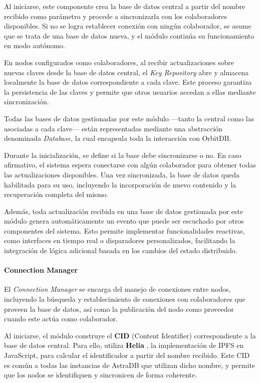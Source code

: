 Al iniciarse, este componente crea la base de datos central a partir del nombre recibido como parámetro y procede a sincronizarla con los colaboradores disponibles. Si no se logra establecer conexión con ningún colaborador, se asume que se trata de una base de datos nueva, y el módulo continúa su funcionamiento en modo autónomo.

En nodos configurados como colaboradores, al recibir actualizaciones sobre nuevas claves desde la base de datos central, el \textit{Key Repository} abre y almacena localmente la base de datos correspondiente a cada clave. Este proceso garantiza la persistencia de las claves y permite que otros usuarios accedan a ellas mediante sincronización.

Todas las bases de datos gestionadas por este módulo —tanto la central como las asociadas a cada clave— están representadas mediante una abstracción denominada \textit{Database}, la cual encapsula toda la interacción con OrbitDB.

Durante la inicialización, se define si la base debe sincronizarse o no. En caso afirmativo, el sistema espera conectarse con algún colaborador para obtener todas las actualizaciones disponibles. Una vez sincronizada, la base de datos queda habilitada para su uso, incluyendo la incorporación de nuevo contenido y la recuperación completa del mismo.

Además, toda actualización recibida en una base de datos gestionada por este módulo genera automáticamente un evento que puede ser escuchado por otros componentes del sistema. Esto permite implementar funcionalidades reactivas, como interfaces en tiempo real o disparadores personalizados, facilitando la integración de lógica adicional basada en los cambios del estado distribuido.

\paragraph{Connection Manager}

El \textit{Connection Manager} se encarga del manejo de conexiones entre nodos, incluyendo la búsqueda y establecimiento de conexiones con colaboradores que proveen la base de datos, así como la publicación del nodo como proveedor cuando este actúa como colaborador.

Al iniciarse, el módulo construye el \textbf{CID} (Content Identifier) correspondiente a la base de datos central. Para ello, utiliza \textbf{Helia} \cite{helia}, la implementación de IPFS en JavaScript, para calcular el identificador a partir del nombre recibido. Este CID es común a todas las instancias de AstraDB que utilizan dicho nombre, y permite que los nodos se identifiquen y sincronicen de forma coherente.

